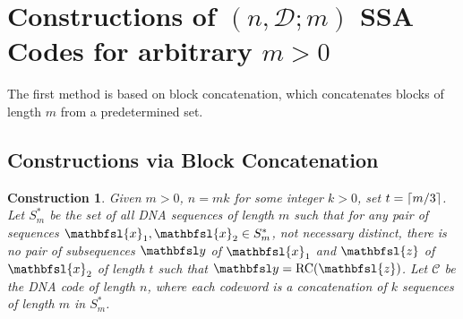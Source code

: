 \documentclass[conference]{IEEEtran}
\DeclarePairedDelimiter\ceil{\lceil}{\rceil}
\theoremstyle{plain}
\newtheorem{lemma}{Lemma}
\newtheorem{conjecture}{Conjecture}
\newtheorem{construction}{Construction}
\theoremstyle{definition}
\newcommand{\hm}[1]{{\color{magenta}(HM: #1)}}
\newcommand{\C}{{\mathcal C}}
\newcommand{\D}{{\mathcal D}}
\newcommand{\by}{{\mathbfsl y}}
\newcommand{\bx}{{\mathbfsl{x}}}
\newcommand{\bz}{{\mathbfsl{z}}}
\renewcommand{\le}{\leqslant}
\begin{document}
\section{Constructions of $(n,\D;m)$ SSA Codes for arbitrary $m>0$} 
The first method is based on block concatenation, which concatenates blocks of length $m$ from a predetermined set.

\subsection{Constructions via Block Concatenation}
\begin{construction}\label{fixed-concatenate}
Given $m>0$, $n=mk$ for some integer $k>0$, set $t=\ceil{m/3}$. Let $S_m^*$ be the set of all DNA sequences of length $m$ such that for any pair of sequences $\bx_1,\bx_2 \in S_m^*$, not necessary distinct, there is no pair of subsequences $\by$ of $\bx_1$ and $\bz$ of $\bx_2$ of length $t$ such that $\by={\rm RC}(\bz)$. Let $\C$ be the DNA code of length $n$, where each codeword is a concatenation of $k$ sequences of length $m$ in $S_m^*$.
\end{construction} 
\end{document}
